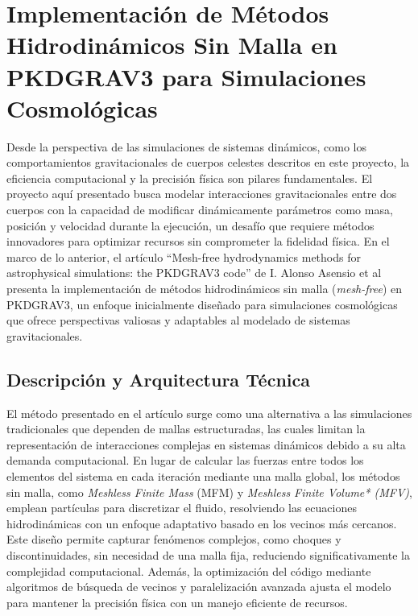 \section[Métodos Hidrodinámicos Sin Malla]{Implementación de Métodos Hidrodinámicos Sin Malla en PKDGRAV3 para Simulaciones Cosmológicas}%
\label{sec:state_of_the_art_04}

Desde la perspectiva de las simulaciones de sistemas dinámicos, como los comportamientos gravitacionales de cuerpos celestes descritos en este proyecto, la eficiencia computacional y la precisión física son pilares fundamentales. El proyecto aquí presentado busca modelar interacciones gravitacionales entre dos cuerpos con la capacidad de modificar dinámicamente parámetros como masa, posición y velocidad durante la ejecución, un desafío que requiere métodos innovadores para optimizar recursos sin comprometer la fidelidad física. En el marco de lo anterior, el artículo ``Mesh-free hydrodynamics methods for astrophysical simulations: the PKDGRAV3 code'' de I. Alonso Asensio et al~\cite{AlonsoAsensio2022} presenta la implementación de métodos hidrodinámicos sin malla (\textit{mesh-free}) en PKDGRAV3, un enfoque inicialmente diseñado para simulaciones cosmológicas que ofrece perspectivas valiosas y adaptables al modelado de sistemas gravitacionales.

\subsection{Descripción y Arquitectura Técnica}

El método presentado en el artículo surge como una alternativa a las simulaciones tradicionales que dependen de mallas estructuradas, las cuales limitan la representación de interacciones complejas en sistemas dinámicos debido a su alta demanda computacional. En lugar de calcular las fuerzas entre todos los elementos del sistema en cada iteración mediante una malla global, los métodos sin malla, como \textit{Meshless Finite Mass} (MFM) y \textit{Meshless Finite Volume* (MFV)}, emplean partículas para discretizar el fluido, resolviendo las ecuaciones hidrodinámicas con un enfoque adaptativo basado en los vecinos más cercanos. Este diseño permite capturar fenómenos complejos, como choques y discontinuidades, sin necesidad de una malla fija, reduciendo significativamente la complejidad computacional. Además, la optimización del código mediante algoritmos de búsqueda de vecinos y paralelización avanzada ajusta el modelo para mantener la precisión física con un manejo eficiente de recursos.

